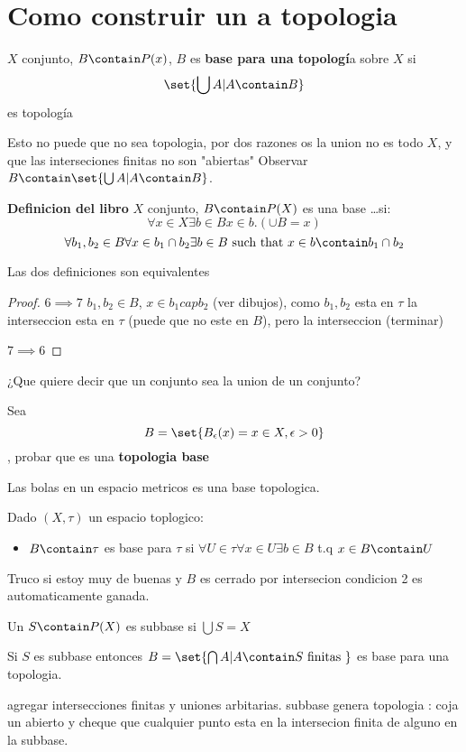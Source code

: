 \section{Como construir un a topologia}
\begin{define}
	$X$ conjunto, $B \contain P(x) $, $B$ es \textbf{base para una topologí}a sobre $X$ si
	\[ \set{\bigcup A | A \contain B} \]
	es topología
\end{define}
Esto no puede que no sea topologia, por dos razones os la union no es todo $X$, y que las interseciones finitas no son "abiertas"
Observar $ B \contain \set{\bigcup A | A \contain B} $.

\begin{define}
	\textbf{Definicion del libro} $X$ conjunto, $ B \contain P(X) $ es una base \ldots si:
	\[ \forall x \in X \exists b \in B x \in b. (\cup B = x) \]
	\[ \forall b_1, b_2 \in B \forall x \in b_1 \cap b_2 \exists b \in B \text{ such that } x \in b \contain b_1 \cap b_2 \]
\end{define}

\begin{thm}
	Las dos definiciones son equivalentes
\end{thm}

\begin{proof}
	$ 6 \implies 7 $  $ b_1, b_2 \in B$, $ x \in b_1 cap b_2$ (ver dibujos), como $ b_1, b_2$ esta en $ \tau$ la interseccion esta en $\tau$ (puede que no este en $B$), pero la interseccion (terminar)   
	
	$ 7 \implies 6 $
\end{proof}
¿Que quiere decir que un conjunto sea la union de un conjunto?

\begin{thm}
	Sea \[B = \set{B_\epsilon(x) = x \in X, \epsilon > 0 } \], probar que es una \textbf{topologia base}
\end{thm}
Las bolas en un espacio metricos es una base topologica.
\begin{define}
	Dado $ (X, \tau) $ un espacio toplogico:
	\begin{itemize}
		\item $B \contain \tau$ es base para $\tau $ si $ \forall U \in \tau \forall x \in U \exists b \in B $ t.q $ x \in B \contain U$
	\end{itemize}
\end{define}
Truco si estoy muy de buenas y $B$ es cerrado por intersecion condicion 2 es automaticamente ganada.
\begin{define}
	Un $S \contain P(X) $ es subbase si $ \bigcup S = X$
\end{define}
\begin{thm}
	Si $S$ es subbase entonces $B = \set{ \bigcap A | A \contain S \text{ finitas }} $ es base para una topologia.
\end{thm}
agregar intersecciones finitas y uniones arbitarias.
subbase genera topologia : coja un abierto y cheque que cualquier punto esta en la intersecion finita de alguno en la subbase.